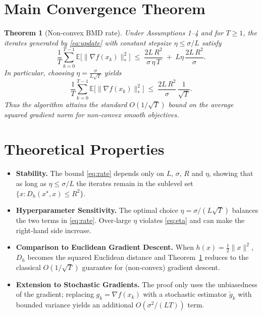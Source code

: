 \documentclass{article}
\newtheorem{theorem}{Theorem}
\begin{document}
\section*{Main Convergence Theorem}
\begin{theorem}[Non‑convex BMD rate]\label{thm:main}
Under Assumptions 1–4 and for $T\ge1$, the iterates generated by \eqref{eq:update} with constant stepsize $\eta\le\sigma/L$ satisfy
\begin{equation}
\frac{1}{T}\sum_{k=0}^{T-1}\mathbb{E}\big[\|\nabla f(x_k)\|_{*}^{2}\big]
\;\le\;
\frac{2L\,R^{2}}{\sigma\,\eta\,T}
\;+\;
L\eta\,\frac{2L\,R^{2}}{\sigma}.
\label{eq:rate}
\end{equation}
In particular, choosing $\displaystyle\eta=\frac{\sigma}{L\sqrt{T}}$ yields
\begin{equation}
\frac{1}{T}\sum_{k=0}^{T-1}\mathbb{E}\big[\|\nabla f(x_k)\|_{*}^{2}\big]
\;\le\;
\frac{2L\,R^{2}}{\sigma}\,\frac{1}{\sqrt{T}} .
\label{eq:rate-opt}
\end{equation}
Thus the algorithm attains the standard $O(1/\sqrt{T})$ bound on the average squared gradient norm for non‑convex smooth objectives.
\end{theorem}

\section*{Theoretical Properties}
\begin{itemize}
\item \textbf{Stability.} The bound \eqref{eq:rate} depends only on $L$, $\sigma$, $R$ and $\eta$, showing that as long as $\eta\le\sigma/L$ the iterates remain in the sublevel set $\{x:D_h(x^{\star},x)\le R^{2}\}$.
\item \textbf{Hyperparameter Sensitivity.} The optimal choice $\eta=\sigma/(L\sqrt{T})$ balances the two terms in \eqref{eq:rate}. Over‑large $\eta$ violates \eqref{eq:eta} and can make the right‑hand side increase.
\item \textbf{Comparison to Euclidean Gradient Descent.} When $h(x)=\tfrac12\|x\|^{2}$, $D_h$ becomes the squared Euclidean distance and Theorem~\ref{thm:main} reduces to the classical $O(1/\sqrt{T})$ guarantee for (non‑convex) gradient descent.
\item \textbf{Extension to Stochastic Gradients.} The proof only uses the unbiasedness of the gradient; replacing $g_k=\nabla f(x_k)$ with a stochastic estimator $\tilde g_k$ with bounded variance yields an additional $O(\sigma^{2}/(L T))$ term.
\end{itemize}
\end{document}
